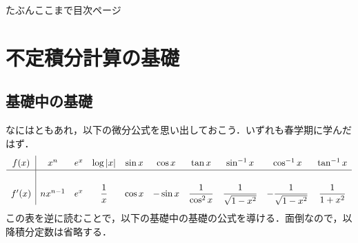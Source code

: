 \documentclass[10pt, uplatex, dvipdfmx]{jsarticle}
\theoremstyle{definition}
\numberwithin{equation}{section}
\begin{document}
\newpage

たぶんここまで目次ページ

\newpage

\section{不定積分計算の基礎}

\subsection{基礎中の基礎}\label{subsec:fundamental}

なにはともあれ，以下の微分公式を思い出しておこう．いずれも春学期に学んだはず．
\[\renewcommand{\arraystretch}{1.3}
  \begin{array}[h]{c|ccccccccc}
    f(x) & x^n & e^x & \log|x| & \sin x & \cos x & \tan x & \sin^{-1}x & \cos ^{-1} x & \tan^{-1} x\\ \hline
    \\
    f'(x) & n x^{n-1} & e^x & \dfrac{1}{x} & \cos x & -\sin x & \dfrac{1}{\cos^2x} & \dfrac{1}{\sqrt{1-x^2}}
                                                                       & -\dfrac{1}{\sqrt{1-x^2}} & \dfrac{1}{1+x^2}
  \end{array}
\]
この表を逆に読むことで，以下の基礎中の基礎の公式を導ける．面倒なので，以降積分定数は省略する．

\vspace{1zh}
\end{document}
